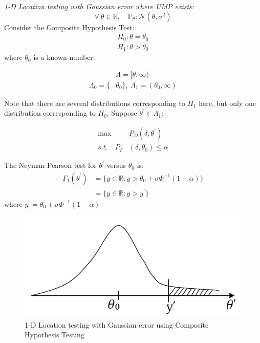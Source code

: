 \documentclass[12pt]{report}
\begin{document}
\begin{exmp}
\emph{1-D Location testing with Gaussian error where UMP exists:}\\
\[\forall\ \theta \in \mathbb{R}, \quad \mathbb{P}_\theta : \mathcal{N}(\theta, \sigma^2)\]
\noindent Consider the Composite Hypothesis Test:
\begin{align*}
H_0:\theta = \theta_0 \\
H_1:\theta > \theta_0
\end{align*}
\noindent where $\theta_0$ is a known number.


\begin{align*}
&\Lambda = [\theta, \infty)\\
\Lambda_0 = \{&\theta_0\} , \ \Lambda_1 = (\theta_0, \infty)
\end{align*}

\noindent Note that there are several distributions corresponding to $H_1$ here, but only one distribution corresponding to $H_0$. Suppose $\theta^\prime \in \Lambda_1$:

\begin{align*}
\max\ &P_D(\delta, \theta^\prime) \\
s.t. \quad P_F&(\delta, \theta_0) \leq \alpha
\end{align*}

\noindent The Neyman-Pearson test for $\theta^\prime$ versus $\theta_0$ is:
\begin{align}
\Gamma_1(\theta^\prime) &= \{ y \in \mathbb{R} : y > \theta_0 + \sigma\Phi^{-1}(1-\alpha)\} \nonumber\\
&= \{ y \in \mathbb{R} : y > y^\prime \} 
\end{align}
where $y^\prime = \theta_0 + \sigma\Phi^{-1}(1-\alpha)$\\

\begin{figure}[h]
\centering
\includegraphics[scale=0.7]{Figures/Lecture8_Fig1}
\caption{1-D Location testing with Gaussian error using Composite Hypothesis Testing }
\label{1-DLocationtestCHT}
\end{figure}





\end{exmp}
\end{document}
